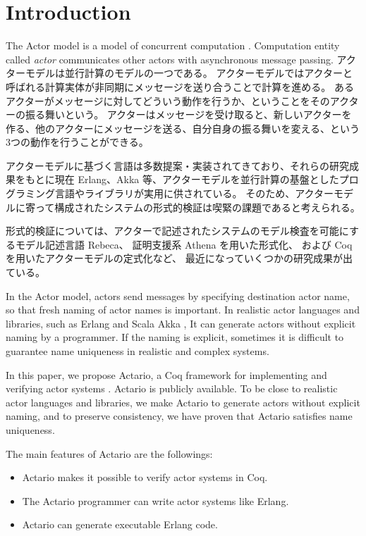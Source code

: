 \section{Introduction}
\label{sec:introduction}

The Actor model is a model of concurrent computation \cite{Agha:1986aa}.
Computation entity called \textit{actor} communicates other actors with asynchronous message passing.
アクターモデルは並行計算のモデルの一つである\cite{Agha:1986aa}。
アクターモデルではアクターと呼ばれる計算実体が非同期にメッセージを送り合うことで計算を進める。
あるアクターがメッセージに対してどういう動作を行うか、ということをそのアクターの振る舞いという。
アクターはメッセージを受け取ると、新しいアクターを作る、他のアクターにメッセージを送る、自分自身の振る舞いを変える、という3つの動作を行うことができる。

アクターモデルに基づく言語は多数提案・実装されてきており、それらの研究成果をもとに現在 Erlang、Akka 等、アクターモデルを並行計算の基盤としたプログラミング言語やライブラリが実用に供されている。
そのため、アクターモデルに寄って構成されたシステムの形式的検証は喫緊の課題であると考えられる。

形式的検証については、アクターで記述されたシステムのモデル検査を可能にするモデル記述言語 Rebeca、
証明支援系 Athena を用いた形式化、
および Coq を用いたアクターモデルの定式化など、
最近になっていくつかの研究成果が出ている。

In the Actor model, actors send messages by specifying destination actor name, so that fresh naming of actor names is important.
In realistic actor languages and libraries, such as Erlang \cite{Erlang} and Scala \cite{Scala} Akka \cite{Akka}, It can generate actors without explicit naming by a programmer.
If the naming is explicit, sometimes it is difficult to guarantee name uniqueness in realistic and complex systems.

In this paper, we propose Actario, a Coq framework for implementing and verifying actor systems \cite{Actario}. Actario is publicly available.
To be close to realistic actor languages and libraries, we make Actario to generate actors without explicit naming, and to preserve consistency, we have proven that Actario satisfies name uniqueness.

The main features of Actario are the followings:

\begin{itemize}
\item Actario makes it possible to verify actor systems in Coq.
\item The Actario programmer can write actor systems like Erlang.
\item Actario can generate executable Erlang code.
\end{itemize}

